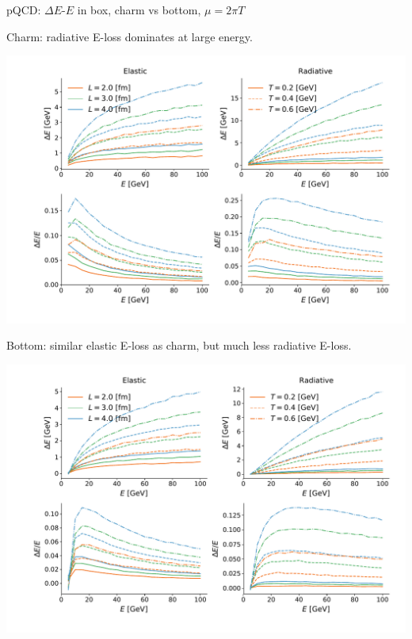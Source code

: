 \documentclass[11pt]{beamer}
\begin{document}
\begin{frame}{pQCD: $\Delta E$-$E$ in box, charm vs bottom, $\mu = 2\pi T$}
\begin{overprint}
Charm: radiative E-loss dominates at large energy.
\begin{center}
\includegraphics[width=\textwidth]{fig/charm-plot/E_Eloss.pdf}
\end{center}
Bottom: similar elastic E-loss as charm, but much less radiative E-loss.
\begin{center}
\includegraphics[width=\textwidth]{fig/bottom-plot/E_Eloss.pdf}
\end{center}
\end{overprint}
\end{frame}
\end{document}

